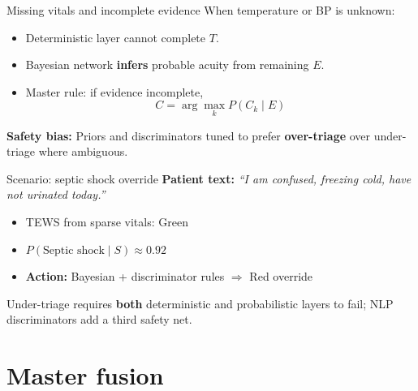 \documentclass[aspectratio=169,11pt]{beamer}
\newcommand{\bcol}[2][blue!70!black]{\textcolor{#1}{#2}}
\begin{document}
\begin{frame}{Missing vitals and incomplete evidence}
	When temperature or BP is unknown:
	\begin{itemize}
		\item Deterministic layer cannot complete $T$.
		\item Bayesian network \textbf{infers} probable acuity from remaining $E$.
		\item Master rule: if evidence incomplete,
		\[
		C = \arg\max_k P(C_k \mid E)
		\]
	\end{itemize}

	\vspace{0.3em}
	\textbf{Safety bias:} Priors and discriminators tuned to prefer \textbf{over-triage} over under-triage where ambiguous.
\end{frame}

\begin{frame}{Scenario: septic shock override}
	\textbf{Patient text:} \textit{``I am confused, freezing cold, have not urinated today.''}

	\vspace{0.2em}
	\begin{itemize}
		\item TEWS from sparse vitals: \bcol[triageGreen]{Green}
		\item $P(\text{Septic shock} \mid S) \approx 0.92$
		\item \textbf{Action:} Bayesian + discriminator rules $\Rightarrow$ \bcol[triageRed]{Red} override
	\end{itemize}

	\vspace{0.3em}
	Under-triage requires \textbf{both} deterministic and probabilistic layers to fail; NLP discriminators add a third safety net.
\end{frame}

\section{Master fusion}
\end{document}

